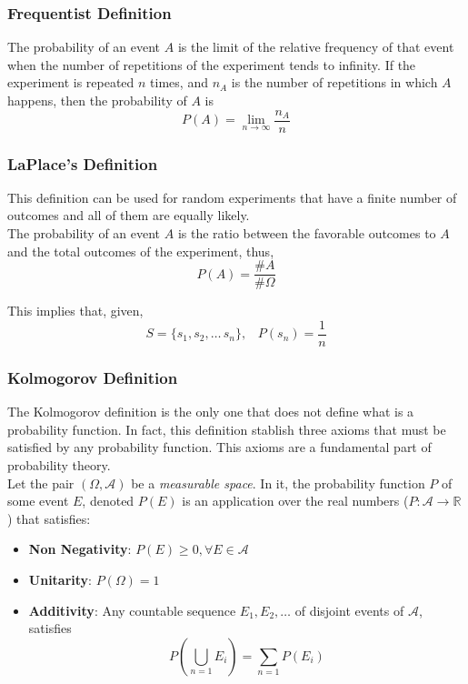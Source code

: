 \subsubsection{Frequentist Definition}
The probability of an event $A$ is the limit of the relative frequency of that
event when the number of repetitions of the experiment tends to infinity. If the
experiment is repeated $n$ times, and $n_A$ is the number of repetitions in
which $A$ happens, then the probability of $A$ is
\[ P(A) = \lim_{n \rightarrow \infty} \frac{n_A}{n} \] 

\subsubsection{LaPlace's Definition}
This definition can be used for random experiments that have a finite number of
outcomes and all of them are equally likely.\\
The probability of an event $A$ is the ratio between the favorable outcomes to
$A$ and the total outcomes of the experiment, thus,
\[  P(A) = \frac{\#A}{\#\Omega}  \]

This implies that, given,
\[ S = \{s_1,s_2,\dots\, s_n\},\;\;\; P(s_n)=\frac{1}{n} \]

\subsubsection{Kolmogorov Definition}
The Kolmogorov definition is the only one that does not define what is a
probability function. In fact, this definition stablish three axioms that must
be satisfied by any probability function. This axioms are a fundamental part of
probability theory.\\
Let the pair $(\Omega, \mathcal{A})$ be a \textit{measurable space}. In it, the
probability function $P$ of some event $E$, denoted $P(E)$ is an application
over the real numbers ($P: \mathcal{A} \rightarrow \mathbb{R}$) that satisfies:

\begin{itemize}
    \item \textbf{Non Negativity}: $P(E) \geq 0, \forall E \in \mathcal{A}$
    \item \textbf{Unitarity}: $P(\Omega) = 1$
    \item \textbf{Additivity}: Any countable sequence $E_1, E_2, \dots$ of
    disjoint events of $\mathcal{A}$, satisfies
            \[ P(\bigcup_{n=1} E_i) = \sum_{n=1} P(E_i) \]
\end{itemize}

